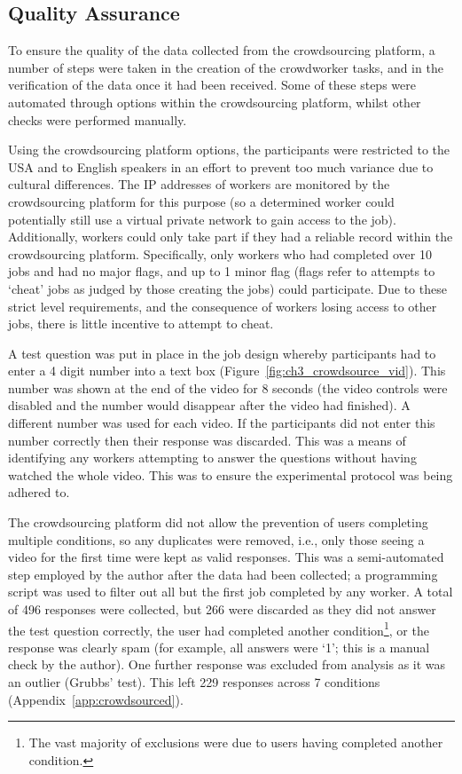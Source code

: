 \subsection{Quality Assurance}
To ensure the quality of the data collected from the crowdsourcing platform, a number of steps were taken in the creation of the crowdworker tasks, and in the verification of the data once it had been received. Some of these steps were automated through options within the crowdsourcing platform, whilst other checks were performed manually.

Using the crowdsourcing platform options, the participants were restricted to the USA and to English speakers in an effort to prevent too much variance due to cultural differences. The IP addresses of workers are monitored by the crowdsourcing platform for this purpose (so a determined worker could potentially still use a virtual private network to gain access to the job). Additionally, workers could only take part if they had a reliable record within the crowdsourcing platform. Specifically, only workers who had completed over 10 jobs and had no major flags, and up to 1 minor flag (flags refer to attempts to `cheat' jobs as judged by those creating the jobs) could participate. Due to these strict level requirements, and the consequence of workers losing access to other jobs, there is little incentive to attempt to cheat.

A test question was put in place in the job design whereby participants had to enter a 4 digit number into a text box (Figure~\ref{fig:ch3_crowdsource_vid}). This number was shown at the end of the video for 8 seconds (the video controls were disabled and the number would disappear after the video had finished). A different number was used for each video. If the participants did not enter this number correctly then their response was discarded. This was a means of identifying any workers attempting to answer the questions without having watched the whole video. This was to ensure the experimental protocol was being adhered to.

The crowdsourcing platform did not allow the prevention of users completing multiple conditions, so any duplicates were removed, i.e., only those seeing a video for the first time were kept as valid responses. This was a semi-automated step employed by the author after the data had been collected; a programming script was used to filter out all but the first job completed by any worker. A total of 496 responses were collected, but 266 were discarded as they did not answer the test question correctly, the user had completed another condition\footnote{The vast majority of exclusions were due to users having completed another condition.}, or the response was clearly spam (for example, all answers were `1'; this is a manual check by the author). One further response was excluded from analysis as it was an outlier (Grubbs' test). This left 229 responses across 7 conditions (Appendix~\ref{app:crowdsourced}).

